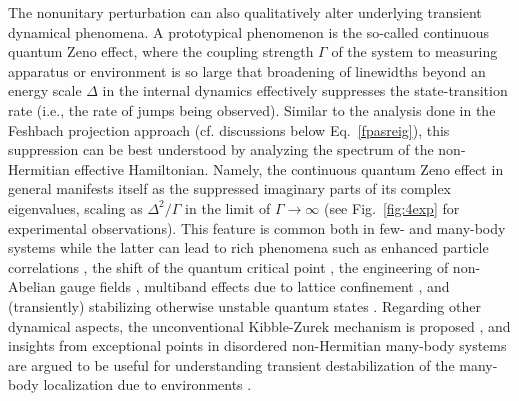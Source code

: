 \documentclass{tADP2e}
\theoremstyle{plain}
\theoremstyle{plain}
\theoremstyle{definition}
\begin{document}
The nonunitary perturbation can also qualitatively alter underlying transient dynamical phenomena. A prototypical phenomenon is the so-called continuous quantum Zeno effect, where the coupling strength $\Gamma$ of the system to  measuring apparatus or environment is so large that broadening of linewidths beyond an energy scale $\Delta$ in the internal dynamics effectively suppresses the state-transition rate (i.e., the rate of jumps being observed). Similar to the analysis done in the Feshbach projection approach (cf. discussions below Eq.~\eqref{fpasreig}), this suppression can be best understood by analyzing the spectrum of the non-Hermitian effective Hamiltonian. Namely, the continuous quantum Zeno effect {\cite{BA00,ZP14,BM20,ZG20}} in general manifests itself as the suppressed imaginary parts of its complex eigenvalues, scaling as $\Delta^2/\Gamma$ in the limit of $\Gamma\to\infty$ (see Fig.~\ref{fig:4exp} for experimental observations). This feature is common both in few- and many-body systems while the latter can lead to rich phenomena such as enhanced particle correlations \cite{DAJ09,JJGR09,DSG09}, the shift of the quantum critical point \cite{YA16crit,TT17}, the engineering of non-Abelian gauge fields \cite{KS14}, multiband effects due to lattice confinement \cite{ZB14,YB13}, and (transiently) stabilizing otherwise unstable quantum states \cite{PB07,DAJ09,DS10,MOROZ2010491,ZZ20,NM202,NM20,BB20,PL20}. Regarding other dynamical aspects, the unconventional Kibble-Zurek mechanism is proposed {\cite{YS17,DB192,PX20}}, and insights from exceptional points in disordered non-Hermitian many-body systems are argued to be useful for understanding transient destabilization of the many-body localization due to environments \cite{LDJ19}. 
\end{document}
